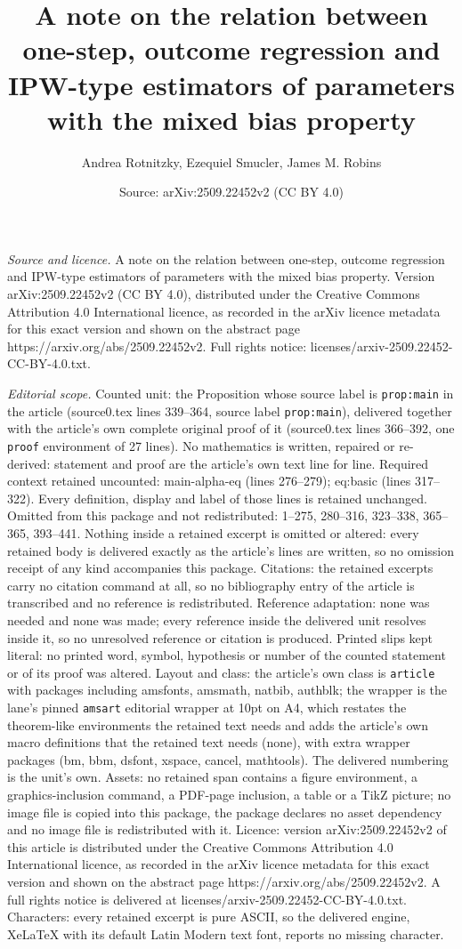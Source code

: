 \documentclass[10pt,a4paper]{amsart}
\title[A note on the relation between one-step, outcome regression ]{A note on the relation between one-step, outcome regression and IPW-type estimators of parameters with the mixed bias property}
\author{Andrea Rotnitzky, Ezequiel Smucler, James M. Robins}
\date{Source: arXiv:2509.22452v2 (CC BY 4.0)}
\begin{document}
\maketitle

\noindent\emph{Source and licence.} A note on the relation between one-step, outcome regression and IPW-type estimators of parameters with the mixed bias property. Version arXiv:2509.22452v2 (CC BY 4.0), distributed under the Creative Commons Attribution 4.0 International licence, as recorded in the arXiv licence metadata for this exact version and shown on the abstract page https://arxiv.org/abs/2509.22452v2. Full rights notice: licenses/arxiv-2509.22452-CC-BY-4.0.txt.\par\smallskip

\noindent\textit{Editorial scope.} Counted unit: the Proposition whose source label is \texttt{prop:main} in the article (source0.tex lines 339--364, source label \texttt{prop:main}), delivered together with the article's own complete original proof of it (source0.tex lines 366--392, one \texttt{proof} environment of 27 lines). No mathematics is written, repaired or re-derived: statement and proof are the article's own text line for line. Required context retained uncounted: main-alpha-eq (lines 276--279); eq:basic (lines 317--322). Every definition, display and label of those lines is retained unchanged. Omitted from this package and not redistributed: 1--275, 280--316, 323--338, 365--365, 393--441. Nothing inside a retained excerpt is omitted or altered: every retained body is delivered exactly as the article's lines are written, so no omission receipt of any kind accompanies this package. Citations: the retained excerpts carry no citation command at all, so no bibliography entry of the article is transcribed and no reference is redistributed. Reference adaptation: none was needed and none was made; every reference inside the delivered unit resolves inside it, so no unresolved reference or citation is produced. Printed slips kept literal: no printed word, symbol, hypothesis or number of the counted statement or of its proof was altered. Layout and class: the article's own class is \texttt{article} with packages including amsfonts, amsmath, natbib, authblk; the wrapper is the lane's pinned \texttt{amsart} editorial wrapper at 10pt on A4, which restates the theorem-like environments the retained text needs and adds the article's own macro definitions that the retained text needs (none), with extra wrapper packages (bm, bbm, dsfont, xspace, cancel, mathtools). The delivered numbering is the unit's own. Assets: no retained span contains a figure environment, a graphics-inclusion command, a PDF-page inclusion, a table or a TikZ picture; no image file is copied into this package, the package declares no asset dependency and no image file is redistributed with it. Licence: version arXiv:2509.22452v2 of this article is distributed under the Creative Commons Attribution 4.0 International licence, as recorded in the arXiv licence metadata for this exact version and shown on the abstract page https://arxiv.org/abs/2509.22452v2. A full rights notice is delivered at licenses/arxiv-2509.22452-CC-BY-4.0.txt. Characters: every retained excerpt is pure ASCII, so the delivered engine, XeLaTeX with its default Latin Modern text font, reports no missing character.
\end{document}
